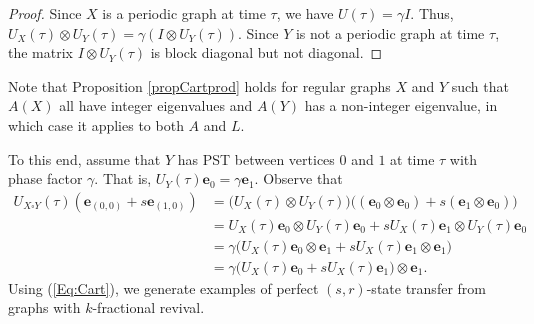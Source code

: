 \documentclass{article}
\numberwithin{equation}{section}
\newcommand{\be}{\mathbf e}
\begin{document}
{\begin{proof}
Since $X$ is a periodic graph at time $\tau$, we have $U(\tau)=\gamma I$. Thus,
$U_X(\tau)\otimes U_Y(\tau)=\gamma(I\otimes U_Y(\tau))$. Since $Y$ is not a periodic graph at time $\tau$, the matrix $I\otimes U_Y(\tau)$ is block diagonal but not diagonal.
\end{proof}
Note that Proposition \ref{propCartprod}
holds for regular graphs $X$ and $Y$ such that $A(X)$ all have integer eigenvalues and $A(Y)$ has a non-integer eigenvalue, in which case it applies to both $A$ and $L$.

To this end, assume that $Y$ has PST between vertices $0$ and $1$ at time $\tau$ with phase factor $\gamma$. That is, $U_{Y}(\tau)\be_{0}=\gamma\be_{1}$. Observe that
\begin{equation}
\label{Eq:Cart}
\begin{split}
U_{X\square Y}(\tau)(\be_{(0,0)}+s\be_{(1,0)})&=\big(U_{X}(\tau)\otimes U_{Y}(\tau)\big)
\big((\be_{0}\otimes \be_{0})+s(\be_{1}\otimes\be_{0})\big)\\
&=U_{X}(\tau)\be_{0}\otimes U_{Y}(\tau)\be_{0}+sU_{X}(\tau)\be_{1}\otimes U_{Y}(\tau)\be_{0}\\
&=\gamma \big(U_{X}(\tau)\be_{0}\otimes\be_{1}+sU_{X}(\tau)\be_{1}\otimes \be_{1}\big)\\
&=\gamma \big(U_{X}(\tau)\be_{0}+sU_{X}(\tau)\be_{1}\big)\otimes\be_{1}.
\end{split}
\end{equation}
Using (\ref{Eq:Cart}), we generate examples of perfect $(s,r)$-state transfer from graphs with $k$-fractional revival.

}
\end{document}
